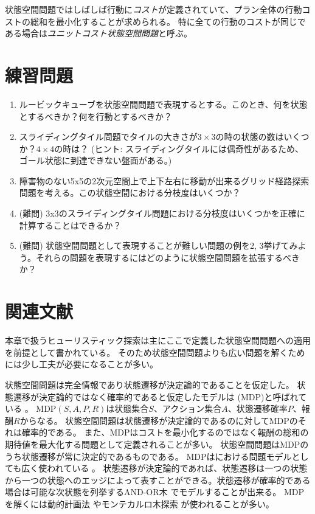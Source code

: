 状態空間問題ではしばしば行動に{\it コスト}が定義されていて、プラン全体の行動コストの総和を最小化することが求められる。
特に全ての行動のコストが同じである場合は{\it ユニットコスト状態空間問題}と呼ぶ。

\section{練習問題}

\begin{enumerate}
  \item ルービックキューブを状態空間問題で表現するとする。このとき、何を状態とするべきか？何を行動とするべきか？
  
  \item スライディングタイル問題でタイルの大きさが$3 \times 3$の時の状態の数はいくつか？$4 \times 4$の時は？
  (ヒント: スライディングタイルには偶奇性があるため、ゴール状態に到達できない盤面がある。)
  
  \item 障害物のない5x5の2次元空間上で上下左右に移動が出来るグリッド経路探索問題を考える。この状態空間における分枝度はいくつか？

  \item (難問) 3x3のスライディングタイル問題における分枝度はいくつかを正確に計算することはできるか？
  
  \item (難問) 状態空間問題として表現することが難しい問題の例を2, 3挙げてみよう。それらの問題を表現するにはどのように状態空間問題を拡張するべきか？
\end{enumerate}


\section{関連文献}

本章で扱うヒューリスティック探索は主にここで定義した状態空間問題への適用を前提として書かれている。
そのため状態空間問題よりも広い問題を解くためには少し工夫が必要になることが多い。

状態空間問題は完全情報であり状態遷移が決定論的であることを仮定した。
状態遷移が決定論的ではなく確率的であると仮定したモデルは (MDP)と呼ばれている \cite{puterman2014markov}。
MDP$(S, A, P, R)$は状態集合$S$、アクション集合$A$、状態遷移確率$P$、報酬$R$からなる。
状態空間問題は状態遷移が決定論的であるのに対してMDPのそれは確率的である。
また、MDPはコストを最小化するのではなく報酬の総和の期待値を最大化する問題として定義されることが多い。
状態空間問題はMDPのうち状態遷移が常に決定的であるものである。
MDPはにおける問題モデルとしても広く使われている \cite{sutton:99}。
状態遷移が決定論的であれば、状態遷移は一つの状態から一つの状態へのエッジによって表すことができる。状態遷移が確率的である場合は可能な次状態を列挙するAND-OR木 \cite{luger1997artificial}でモデルすることが出来る。
MDPを解くには動的計画法 \cite{puterman2014markov,barto1995learning}やモンテカルロ木探索 \cite{browne2012survey,kocsis2006bandit}が使われることが多い。

